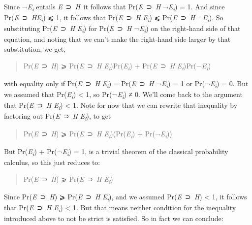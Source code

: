 \documentclass[
  10pt,
  letterpaper,
  DIV=11,
  numbers=noendperiod,
  twoside]{scrartcl}
\begin{document}
Since ¬\emph{E\textsubscript{i}} entails \emph{E}~⊃~\emph{H}~it follows
that Pr(\emph{E}~⊃~\emph{H}\textbar{} ¬\emph{E\textsubscript{i}}) = 1.
And since Pr(\emph{E}~⊃~\emph{H}\textbar{}\emph{E\textsubscript{i}}) ⩽
1, it follows that Pr(\emph{E}~⊃~\emph{H}\textbar{}
\emph{E\textsubscript{i}}) ⩽ Pr(\emph{E}~⊃~\emph{H}\textbar{}
¬\emph{E\textsubscript{i}}). So substituting
Pr(\emph{E}~⊃~\emph{H}\textbar{} \emph{E\textsubscript{i}}) for
Pr(\emph{E}~⊃~\emph{H}\textbar{} ¬\emph{E\textsubscript{i}}) on the
right-hand side of that equation, and noting that we can't make the
right-hand side larger by that substitution, we get,

\begin{quote}
Pr(\emph{E}~⊃~\emph{H}) ⩾ Pr(\emph{E}~⊃~\emph{H}\textbar{}
\emph{E\textsubscript{i}})Pr(\emph{E\textsubscript{i}}) +
Pr(\emph{E}~⊃~\emph{H}\textbar{}
\emph{E\textsubscript{i}})Pr(¬\emph{E\textsubscript{i}})
\end{quote}

with equality only if Pr(\emph{E}~⊃~\emph{H}\textbar{}
\emph{E\textsubscript{i}}) = Pr(\emph{E}~⊃~\emph{H}\textbar{}
¬\emph{E\textsubscript{i}}) = 1 or Pr(¬\emph{E\textsubscript{i}}) = 0.
But we assumed that Pr(\emph{E\textsubscript{i}}) \textless{} 1, so
Pr(¬\emph{E\textsubscript{i}}) ≠ 0. We'll come back to the argument that
Pr(\emph{E}~⊃~\emph{H}\textbar{} \emph{E\textsubscript{i}}) \textless{}
1. Note for now that we can rewrite that inequality by factoring out
Pr(\emph{E}~⊃~\emph{H}\textbar{} \emph{E\textsubscript{i}}), to get

\begin{quote}
Pr(\emph{E}~⊃~\emph{H}) ⩾ Pr(\emph{E}~⊃~\emph{H}\textbar{}
\emph{E\textsubscript{i}})(Pr(\emph{E\textsubscript{i}}) +
Pr(¬\emph{E\textsubscript{i}}))
\end{quote}

But Pr(\emph{E\textsubscript{i}}) + Pr(¬\emph{E\textsubscript{i}}) = 1,
is a trivial theorem of the classical probability calculus, so this just
reduces to:

\begin{quote}
Pr(\emph{E}~⊃~\emph{H}) ⩾ Pr(\emph{E}~⊃~\emph{H}\textbar{}
\emph{E\textsubscript{i}})
\end{quote}

Since Pr(\emph{E}~⊃~\emph{H}) ⩾ Pr(\emph{E}~⊃~\emph{H}\textbar{}
\emph{E\textsubscript{i}}), and we assumed Pr(\emph{E}~⊃~\emph{H})
\textless{} 1, it follows that Pr(\emph{E}~⊃~\emph{H}\textbar{}
\emph{E\textsubscript{i}}) \textless{} 1. But that means neither
condition for the inequality introduced above to not be strict is
satisfied. So in fact we can conclude:
\end{document}
